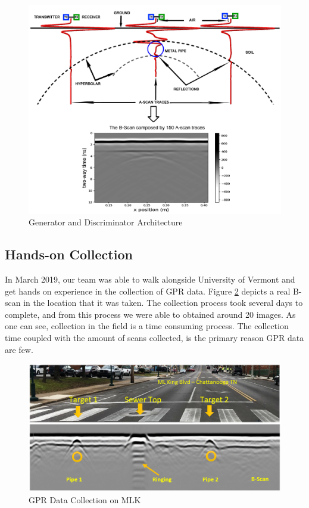 \begin{figure}[H]
  \centering
  \includegraphics[width=1.0\linewidth]{figures/GPR_Original.png}
  \caption{Generator and Discriminator Architecture}
  \label{fig:gpr_basics}
\end{figure}

\subsection{Hands-on Collection}
 In March 2019, our team was able to walk alongside University of Vermont and get hands on experience in the collection of GPR data. Figure \ref{fig:mlk_collection} depicts a real B-scan in the location that it was taken. The collection process took several days to complete, and from this process we were able to obtained around 20 images. As one can see, collection in the field is a time consuming process. The collection time coupled with the amount of scans collected, is the primary reason GPR data are few.
\begin{figure}[H]
    \centering
    \includegraphics[width=\linewidth]{figures/mlk_collection.png}
    \caption{GPR Data Collection on MLK}
    \label{fig:mlk_collection}
\end{figure}
\vspace{\baselineskip}

